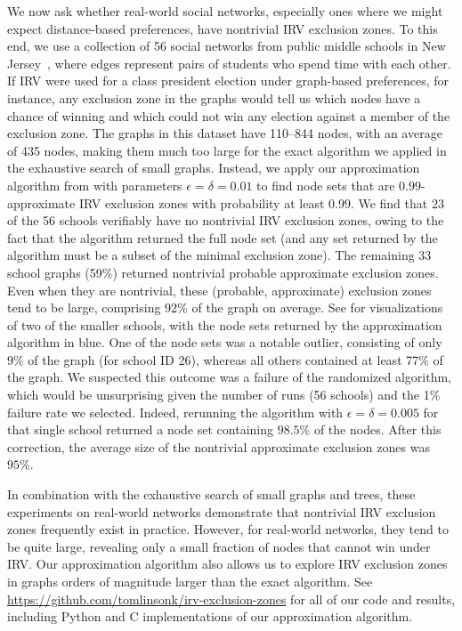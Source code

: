 \documentclass{article}
\theoremstyle{theorem}
\theoremstyle{definition}
\begin{document}
 We now ask whether real-world social networks, especially ones where we might expect distance-based preferences, have nontrivial IRV exclusion zones. To this end, we use a collection of 56 social networks from public middle schools in New Jersey~\cite{paluck2016changing,paluck2016data}, where edges represent pairs of students who spend time with each other. If IRV were used for a class president election under graph-based preferences, for instance, any exclusion zone in the graphs would tell us which nodes have a chance of winning and which could not win any election against a member of the exclusion zone. The graphs in this dataset have 110--844 nodes, with an average of 435 nodes, making them much too large for the exact algorithm we applied in the exhaustive search of small graphs. Instead, we apply our approximation algorithm from  with parameters $\epsilon = \delta = 0.01$ to find node sets that are $0.99$-approximate IRV exclusion zones with probability at least 0.99. We find that 23 of the 56 schools verifiably have no nontrivial IRV exclusion zones, owing to the fact that the algorithm returned the full node set (and any set returned by the algorithm must be a subset of the minimal exclusion zone). The remaining 33 school graphs (59\%) returned nontrivial probable approximate exclusion zones. Even when they are nontrivial, these (probable, approximate) exclusion zones tend to be large, comprising $92\%$ of the graph on average. See  for visualizations of two of the smaller schools, with the node sets returned by the approximation algorithm in blue. One of the node sets was a notable outlier, consisting of only 9\% of the graph (for school ID 26), whereas all others contained at least 77\% of the graph. We suspected this outcome was a failure of the randomized algorithm, which would be unsurprising given the number of runs (56 schools) and the 1\% failure rate we selected. Indeed, rerunning the algorithm with $\epsilon = \delta = 0.005$ for that single school returned a node set containing $98.5\%$ of the nodes. After this correction, the average size of the nontrivial approximate exclusion zones was $95\%$.
 
 In combination with the exhaustive search of small graphs and trees, these experiments on real-world networks demonstrate that nontrivial IRV exclusion zones frequently exist in practice. However, for real-world networks, they tend to be quite large, revealing only a small fraction of nodes that cannot win under IRV. Our approximation algorithm also allows us to explore IRV exclusion zones in graphs orders of magnitude larger than the exact algorithm.  See \url{https://github.com/tomlinsonk/irv-exclusion-zones} for all of our code and results, including Python and C implementations of our approximation algorithm. 
 
\end{document}
